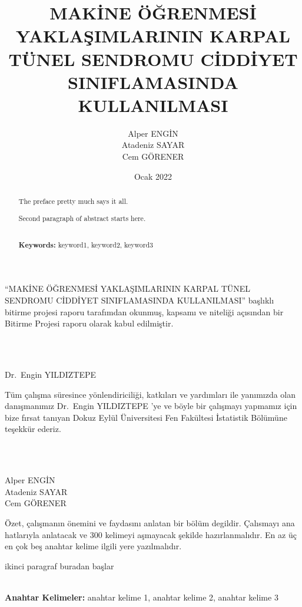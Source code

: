 \documentclass[12pt,twoside]{deuthesis}
\title{MAKİNE ÖĞRENMESİ YAKLAŞIMLARININ KARPAL TÜNEL SENDROMU CİDDİYET SINIFLAMASINDA KULLANILMASI}
\author{Alper ENGİN \\ Atadeniz SAYAR \\ Cem GÖRENER} %
\date{Ocak 2022}
\begin{document}
  \maketitle

\frontmatter %
\pagestyle{empty} %
\begin{preface}
	``MAKİNE ÖĞRENMESİ YAKLAŞIMLARININ KARPAL TÜNEL SENDROMU CİDDİYET SINIFLAMASINDA KULLANILMASI'' başlıklı bitirme projesi raporu tarafımdan okunmuş, kapsamı ve niteliği açısından bir Bitirme Projesi raporu olarak kabul edilmiştir.\\
 \strut \\
 \strut \\
 Dr.~Engin YILDIZTEPE
\end{preface}
  \begin{acknowledgements}
    Tüm çalışma süresince yönlendiriciliği, katkıları ve yardımları ile yanımızda olan danışmanımız Dr.~Engin YILDIZTEPE 'ye ve böyle bir çalışmayı yapmamız için bize fırsat tanıyan Dokuz Eylül Üniversitesi Fen Fakültesi İstatistik Bölümüne teşekkür ederiz.\\
    \strut \\
    \strut \\
    Alper ENGİN\\
    Atadeniz SAYAR\\
    Cem GÖRENER\\
  \end{acknowledgements}
\begin{abstractTR}
	Özet, çalışmanın önemini ve faydasını anlatan bir bölüm degildir. Çalısmayı ana
 hatlarıyla anlatacak ve 300 kelimeyi aşmayacak şekilde hazırlanmalıdır. En az üç en
 çok beş anahtar kelime ilgili yere yazılmalıdır.

 \par

 ikinci paragraf buradan başlar\\
 \strut \\
 \textbf{Anahtar Kelimeler:} anahtar kelime 1, anahtar kelime 2, anahtar kelime 3
\end{abstractTR}
\begin{abstract}
	The preface pretty much says it all.

 \par

 Second paragraph of abstract starts here.\\
 \strut \\
 \textbf{Keywords:} keyword1, keyword2, keyword3
\end{abstract}
\end{document}
